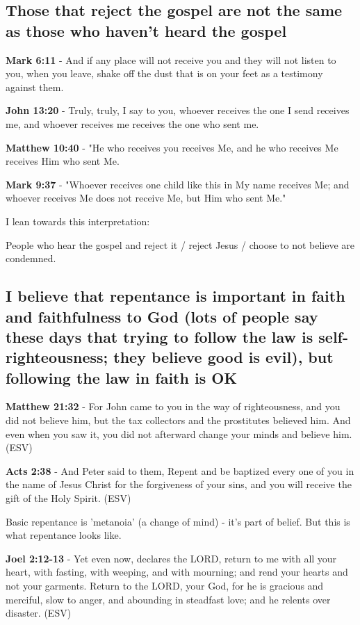 \documentclass[11pt]{article}
\begin{document}
\subsection{Those that reject the gospel are not the same as those who haven't heard the gospel}
\label{sec:org0f0d804}
\textbf{Mark 6:11} - And if any place will not receive you and they will not listen to you, when you leave, shake off the dust that is on your feet as a testimony against them.

\textbf{John 13:20} - Truly, truly, I say to you, whoever receives the one I send receives me, and whoever receives me receives the one who sent me.

\textbf{Matthew 10:40} - "He who receives you receives Me, and he who receives Me receives Him who sent Me.

\textbf{Mark 9:37} - "Whoever receives one child like this in My name receives Me; and whoever receives Me does not receive Me, but Him who sent Me."

I lean towards this interpretation:

People who hear the gospel and reject it / reject Jesus / choose to not believe are condemned.

\subsection{I believe that repentance is important in faith and faithfulness to God (lots of people say these days that trying to follow the law is self-righteousness; they believe good is evil), but following the law in faith is OK}
\label{sec:orgda33a60}

\textbf{Matthew 21:32} - For John came to you in the way of righteousness, and you did not believe him, but the tax collectors and the prostitutes believed him. And even when you saw it, you did not afterward change your minds and believe him. (ESV)

\textbf{Acts 2:38} - And Peter said to them, Repent and be baptized every one of you in the name of Jesus Christ for the forgiveness of your sins, and you will receive the gift of the Holy Spirit. (ESV)

Basic repentance is 'metanoia' (a change of mind) - it's part of belief.
But this is what repentance looks like.

\textbf{Joel 2:12-13} - Yet even now, declares the LORD, return to me with all your heart, with fasting, with weeping, and with mourning; and rend your hearts and not your garments. Return to the LORD, your God, for he is gracious and merciful, slow to anger, and abounding in steadfast love; and he relents over disaster. (ESV)
\end{document}
